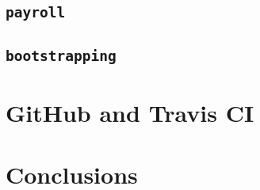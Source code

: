 \documentclass[12pt]{article}
\begin{document}
\subsection{\texttt{payroll}}

\subsection{\texttt{bootstrapping}}

\section{GitHub and Travis CI}

\section{Conclusions}

\end{document}
